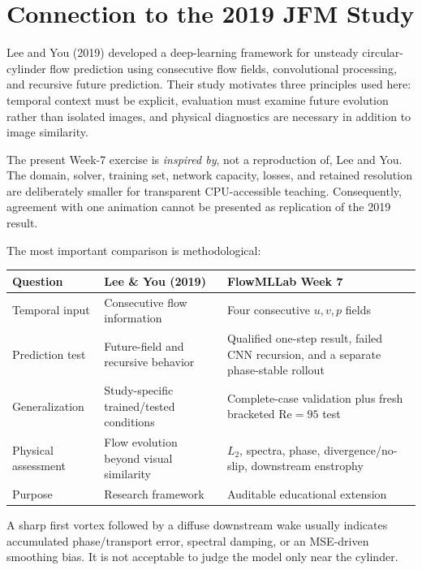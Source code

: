 \documentclass[11pt]{article}
\newcommand{\Rey}{\mathrm{Re}}
\begin{document}
\section{Connection to the 2019 JFM Study}
\begin{paperbox}
Lee and You (2019) developed a deep-learning framework for unsteady
circular-cylinder flow prediction using consecutive flow fields, convolutional
processing, and recursive future prediction. Their study motivates three
principles used here: temporal context must be explicit, evaluation must examine
future evolution rather than isolated images, and physical diagnostics are
necessary in addition to image similarity.
\end{paperbox}

The present Week-7 exercise is \emph{inspired by}, not a reproduction of, Lee and You. The domain, solver, training set, network capacity, losses, and retained resolution are deliberately smaller for transparent CPU-accessible teaching. Consequently, agreement with one animation cannot be presented as replication of the 2019 result.

The most important comparison is methodological:
\begin{center}
\begin{tabular}{p{}p{}p{}}
\toprule
Question & Lee \& You (2019) & FlowMLLab Week 7 \\
\midrule
Temporal input & Consecutive flow information & Four consecutive $u,v,p$ fields \\
Prediction test & Future-field and recursive behavior & Qualified one-step result, failed CNN recursion, and a separate phase-stable rollout \\
Generalization & Study-specific trained/tested conditions & Complete-case validation plus fresh bracketed $\Rey=95$ test \\
Physical assessment & Flow evolution beyond visual similarity & $L_2$, spectra, phase, divergence/no-slip, downstream enstrophy \\
Purpose & Research framework & Auditable educational extension \\
\bottomrule
\end{tabular}
\end{center}

\begin{warningbox}
A sharp first vortex followed by a diffuse downstream wake usually indicates accumulated phase/transport error, spectral damping, or an MSE-driven smoothing bias. It is not acceptable to judge the model only near the cylinder.
\end{warningbox}
\end{document}
